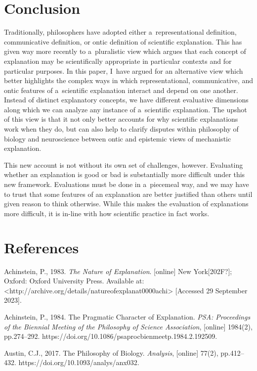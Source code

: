\section*{Conclusion}
Traditionally, philosophers have adopted either a~representational definition, communicative definition, or ontic definition of scientific explanation. This has given way more recently to a~pluralistic view which argues that each concept of explanation may be scientifically appropriate in particular contexts and for particular purposes. In this paper, I~have argued for an alternative view which better highlights the complex ways in which representational, communicative, and ontic features of a~scientific explanation interact and depend on one another. Instead of distinct explanatory concepts, we have different evaluative dimensions along which we can analyze any instance of a~scientific explanation. The upshot of this view is that it not only better accounts for why scientific explanations work when they do, but can also help to clarify disputes within philosophy of biology and neuroscience between ontic and epistemic views of mechanistic explanation.

This new account is not without its own set of challenges, however. Evaluating whether an explanation is good or bad is substantially more difficult under this new framework. Evaluations must be done in a~piecemeal way, and we may have to trust that some features of an explanation are better justified than others until given reason to think otherwise. While this makes the evaluation of explanations more difficult, it is in-line with how scientific practice in fact works.

\section*{References}
Achinstein, P., 1983. \textit{The Nature of Explanation}. [online] New York[202F?]; Oxford: Oxford University Press. Available at: {\textless}http://archive.org/details/natureofexplanat0000achi{\textgreater} [Accessed 29 September 2023].

Achinstein, P., 1984. The Pragmatic Character of Explanation. \textit{PSA: Proceedings of the Biennial Meeting of the Philosophy of Science Association}, [online] 1984(2), pp.274–292. https://doi.org/10.1086/psaprocbienmeetp.1984.2.192509.

Austin, C.J., 2017. The Philosophy of Biology. \textit{Analysis}, [online] 77(2), pp.412–432. https://doi.org/10.1093/analys/anx032.

